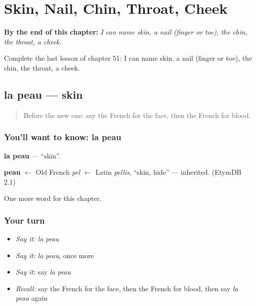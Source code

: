 
\chapter{Skin, Nail, Chin, Throat, Cheek}
\label{ch:fr-skin-nail-chin-throat-cheek}

\begin{chapteropening}
\textbf{By the end of this chapter:} \emph{I can name skin, a nail (finger or toe), the chin, the throat, a cheek.}

Complete the last lesson of chapter 51: I can name skin, a nail (finger or toe), the chin, the throat, a cheek.
\end{chapteropening}

\section[la peau]{la peau — skin}

\label{lesson:FR-C51-peau}



\begin{quote}
Before the new one: say the French for the face, then the French for blood.
\end{quote}

\subsection*{You'll want to know: la peau}
\textbf{la peau} — \textquotedblleft{}skin\textquotedblright{}.

\begin{cousinweb}
\textbf{peau} $\leftarrow$ Old French \emph{pel} $\leftarrow$ Latin \emph{pellis}, \textquotedblleft{}skin, hide\textquotedblright{} — inherited. (EtymDB 2.1)
\end{cousinweb}

\begin{grammarlens}[title={What you've built}]
One more word for this chapter.
\end{grammarlens}

\subsection*{Your turn}
\begin{itemize}
\raggedright
  \item \emph{Say it:} \emph{la peau}
  \item \emph{Say it:} \emph{la peau}, once more
  \item \emph{Say it:} say \emph{la peau}
  \item \emph{Recall:} say the French for the face, then the French for blood, then say \emph{la peau} again
\end{itemize}

